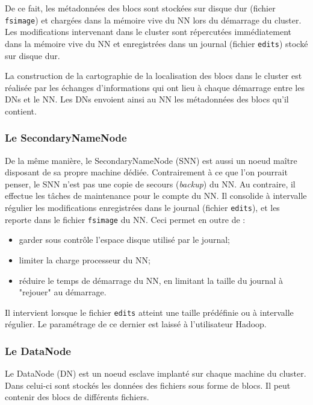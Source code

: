 \smallskip

\par De ce fait, les métadonnées des blocs sont stockées sur disque dur (fichier \texttt{fsimage}) et chargées dans la mémoire vive du NN lors du démarrage du cluster. Les modifications intervenant dans le cluster sont répercutées immédiatement dans la mémoire vive du NN et enregistrées dans un journal (fichier \texttt{edits}) stocké sur disque dur.

\par La construction de la cartographie de la localisation des blocs dans le cluster est réalisée par les échanges d'informations qui ont lieu à chaque démarrage entre les DNs et le NN. Les DNs envoient ainsi au NN les métadonnées des blocs qu'il contient.

\subsubsection{Le SecondaryNameNode} 

\par De la même manière, le SecondaryNameNode (SNN) est aussi un noeud maître disposant de sa propre machine dédiée. Contrairement à ce que l'on pourrait penser, le SNN n'est pas une copie de secours (\textit{backup}) du NN. Au contraire, il effectue les tâches de maintenance pour le compte du NN. Il consolide à intervalle régulier les modifications enregistrées dans le journal (fichier \texttt{edits}), et les reporte dans le fichier \texttt{fsimage} du NN. Ceci permet en outre de :

\begin{itemize}
\item garder sous contrôle l'espace disque utilisé par le journal;
\item limiter la charge processeur du NN;
\item réduire le temps de démarrage du NN, en limitant la taille du journal à "rejouer" au démarrage.
\end{itemize}

\par Il intervient lorsque le fichier \texttt{edits} atteint une taille prédéfinie ou à intervalle régulier. Le paramétrage de ce dernier est laissé à l'utilisateur Hadoop.

\subsubsection{Le DataNode}

\par Le DataNode (DN) est un noeud esclave implanté sur chaque machine du cluster. Dans celui-ci sont stockés les données des fichiers sous forme de blocs. Il peut contenir des blocs de différents fichiers.

